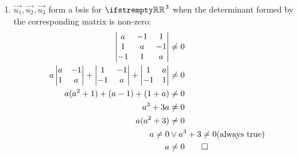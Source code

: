 \documentclass[12pt, a4paper]{article}
\begin{document}
\begin{enumerate}[Q\arabic*.]
    \item $\vec{u_1}, \vec{u_2}, \vec{u_3}$ form a bsis for $\RR^3$ when the determinant formed by the corresponding matrix is non-zero:
      \begin{align*}
        \begin{vmatrix}
          a & -1 & 1\\
          1 & a & -1\\
          -1 & 1 & a  
        \end{vmatrix} &\neq 0\\
        a\begin{vmatrix}a & -1\\1 &a\end{vmatrix} + \begin{vmatrix}1 & -1\\-1&a\end{vmatrix} + \begin{vmatrix}1 & a\\-1 & 1 \end{vmatrix} &\neq 0\\
        a(a^2 + 1) + (a - 1) + (1 + a) &\neq 0\\
        a^3 + 3a &\neq 0\\
        a(a^2 + 3) &\neq 0\\
        a \neq 0 &\lor a^3 + 3 \neq 0\text{(always true)}\\
        a &\neq 0 \qed
      \end{align*}
    \pagebreak


\end{enumerate}
\end{document}
